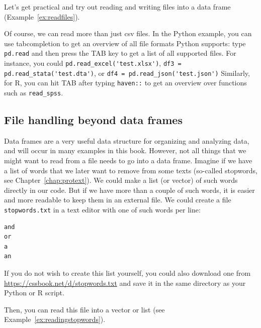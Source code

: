 Let's get practical and try out reading and writing files into a data frame (Example~\ref{ex:readfiles}).


Of course, we can read more than just csv files. In the Python
example, you can use tabcompletion to get an overview of all file
formats Python supports: type \verb|pd.read| and then press the TAB key to
get a list of all supported files. For instance, you could 
\verb|pd.read_excel('test.xlsx')|, \verb|df3 = pd.read_stata('test.dta')|, or
\verb|df4 = pd.read_json('test.json')| Similarly, for R, you can hit TAB
after typing \verb|haven::| to get an overview over functions such as
\verb|read_spss|.

\subsection{File handling beyond data frames}\label{sec:beyonddataframes}
Data frames are a very useful data structure for organizing and analyzing data, and will occur in many examples in this book.
However, not all things that we might want to read from a file needs to go into a data frame.
Imagine if we have a list of words that we later want to remove from some texts (so-called stopwords, see Chapter~\ref{chap:protext}).
We could make a list (or vector) of such words directly in our code.
But if we have more than a couple of such words, it is easier and more readable to keep them in an external file. We could create a file \texttt{stopwords.txt} in a text editor with one of such words per line:

\begin{lstlisting}
and
or
a
an
\end{lstlisting}

If you do not wish to create this list yourself, you could also
download one from \url{https://cssbook.net/d/stopwords.txt} and save it
in the same directory as your Python or R script.

Then, you can read this file into a vector or list  (see Example~\ref{ex:readingstopwords}).



